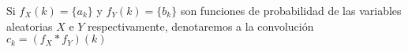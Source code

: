 \begin{Obs}
    Si $f_X(k)=\{a_k\}$ y $f_Y(k)=\{b_k\}$ son funciones de probabilidad de las variables aleatorias $X$ e $Y$ respectivamente, denotaremos a la convolución $c_k=(f_X*f_Y)(k)$
\end{Obs}
